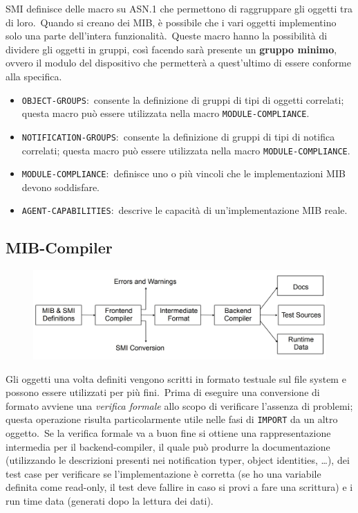 SMI definisce delle macro su ASN.1 che permettono di raggruppare gli oggetti tra di loro.\
Quando si creano dei MIB, è possibile che i vari oggetti implementino solo una parte dell'intera funzionalità.\
Queste macro hanno la possibilità di dividere gli oggetti in gruppi, così facendo sarà presente un \textbf{gruppo minimo}, ovvero il modulo del dispositivo che permetterà a quest'ultimo di essere conforme alla specifica.

\begin{itemize}
    \item \texttt{OBJECT-GROUPS}:\ consente la definizione di gruppi di tipi di oggetti correlati; questa macro può essere utilizzata nella macro \texttt{MODULE-COMPLI\-ANCE}.
    \item \texttt{NOTIFICATION-GROUPS}:\ consente la definizione di gruppi di tipi di notifica correlati; questa macro può essere utilizzata nella macro \texttt{MOD\-ULE-COMPLIANCE}.
    \item \texttt{MODULE-COMPLIANCE}:\ definisce uno o più vincoli che le implementazioni MIB devono soddisfare.
    \item \texttt{AGENT-CAPABILITIES}:\ descrive le capacità di un'implementazione MIB reale.
\end{itemize}

\subsection{MIB-Compiler}

\begin{figure}[H]
    \centering
    \includegraphics[width=\textwidth]{immagini/MIB_Compiler.jpg}
\end{figure}

Gli oggetti una volta definiti vengono scritti in formato testuale sul file system e possono essere utilizzati per più fini.\
Prima di eseguire una conversione di formato avviene una \textit{verifica formale} allo scopo di verificare l'assenza di problemi; questa operazione risulta particolarmente utile nelle fasi di \texttt{IMPORT} da un altro oggetto.\
Se la verifica formale va a buon fine si ottiene una rappresentazione intermedia per il backend-compiler, il quale può produrre la documentazione (utilizzando le descrizioni presenti nei notification typer, object identities, \dots), dei test case per verificare se l'implementazione è corretta (se ho una variabile definita come read-only, il test deve fallire in caso si provi a fare una scrittura) e i run time data (generati dopo la lettura dei dati).

